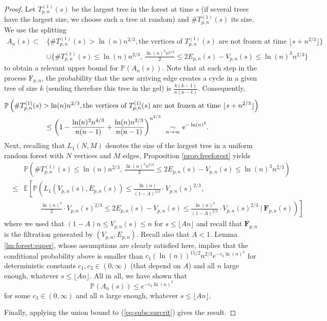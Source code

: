 \documentclass[a4, 11pt]{article}
\numberwithin{equation}{section}
\theoremstyle{plain}
\theoremstyle{definition}
\theoremstyle{remark}
\begin{document}
\begin{proof}
Let $T^{(1)}_{p,n}(s)$ be the largest tree in the forest at time $s$ (if several trees have the largest size, we choose such a tree at random) and $\# T^{(1)}_{p,n}(s)$ its size. We use the splitting
		\begin{align*}
			A_n(s)\subset &\bigg\{\# T^{(1)}_{p,n}(s)>\ln(n)n^{2/3}, \text{the vertices of }T^{(1)}_{p,n}(s)  \text{ are not frozen at time } \lfloor s+n^{2/3} \rfloor \bigg\}\\ & \cup  \bigg\{\# T^{(1)}_{p,n}(s)\leq \ln(n)n^{2/3},\,  \frac{\ln(n)^3n^{2/3}}{2} \leq 2E_{p,n}(s)-V_{p,n}(s)\leq \ln(n)^3n^{2/3} \bigg\}
		\end{align*}
to obtain a relevant upper bound for $\mathbb P(A_n(s))$. Note that at each step in the process $\mathrm{F}_{p,n}$, the probability that the new arriving edge creates a cycle in a given tree of size $k$ (sending therefore this tree in the gel) is $\frac{k(k-1)}{n(n-1)}$. Consequently,		
		\begin{align*}
			& \mathbb P\left(\# T^{(1)}_{p,n}(s)>\ln(n)n^{2/3}, \text{the vertices of }T^{(1)}_{p,n}(s)  \text{ are not frozen at time } \lfloor s+n^{2/3} \rfloor \right)\notag\\
			& \hspace{2cm}\leq \left(1-\frac{\ln(n)^2n^{4/3}}{n(n-1)}+\frac{\ln(n)n^{2/3}}{n(n-1)}\right)^{n^{2/3}}~\underset{n\to \infty}{\sim} \mathrm{e}^{-\ln(n)^2}.\label{eq:largest_treE_{p,n}ot_freeze}
		\end{align*}
	Next, recalling that $L_1(N,M)$ denotes the size of the largest tree in a uniform random forest with $N$ vertices and $M$ edges, Proposition \ref{prop:freeforest} yields
		\begin{eqnarray*}
			&&\mathbb{P}\left(\# T^{(1)}_{p,n}(s)\leq \ln(n)n^{2/3},\, \frac{\ln(n)^3n^{2/3}}{2} \leq 2E_{p,n}(s)-V_{p,n}(s)\leq \ln(n)^3n^{2/3}  \right)\\
			&\leq & \mathbb{E}\left[\mathbb{P}\left(L_1\left(V_{p,n}(s),E_{p,n}(s)\right)\leq  \frac{\ln(n)}{(1-A)^{2/3}} \cdot V_{p,n}(s)^{2/3}, \right.\right.\\
			&& \hspace{1cm}\left. \left. \frac{\ln(n)^3}{2}\cdot V_{p,n}(s)^{2/3} \leq 2E_{p,n}(s)-V_{p,n}(s)\leq \frac{\ln(n)^3}{(1-A)^{2/3}} \cdot V_{p,n}(s)^{2/3}~\Big\vert~\mathbf{F}_{p,n}(s)\right)\right]
		\end{eqnarray*}
where we used that $(1-A)n \leq V_{p,n}(s) \leq n$ for $s\leq \lfloor An \rfloor$ and recall that $\mathbf{F}_{p,n}$ is the filtration generated by $(V_{p,n},E_{p,n})$. Recall also that $A<1$. 	
Lemma \ref{lm:forest:super}, whose assumptions  are clearly satisfied here, implies that the conditional probability above is smaller than $c_1 (\ln(n))^{15/2} n^{2/3} e^{-c_2\ln(n)^2}$ for deterministic constants $c_1,c_2\in (0,\infty)$ (that depend on $A$) and all $n$ large enough, whatever $s \leq \lfloor An\rfloor$. All in all, we have shown that $$\mathbb P(A_n(s)) \leq e^{-c_3 \ln(n)^2}$$
for some $c_3\in (0,\infty)$ and all $n$ large enough, whatever $s \leq \lfloor An\rfloor$.

Finally, applying the union bound to (\ref{eq:subs:surcrit}) gives the result. 
	\end{proof}
	
\end{document}
